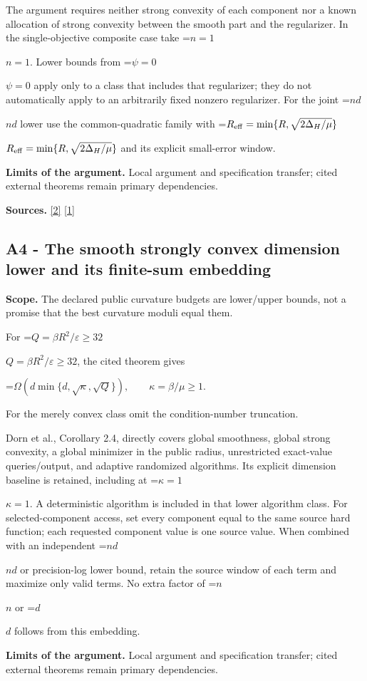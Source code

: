 \documentclass[10pt,a4paper]{article}
\newcommand{\AtlasMath}[1]{\par\begingroup\centering\setbox0=\hbox{$\displaystyle #1$}\ifdim\wd0>1.4\linewidth\typeout{ATLAS WIDE FORMULA: \the\wd0}\fi\ifdim\wd0>\linewidth\resizebox{\linewidth}{!}{\box0}\else\box0\fi\par\endgroup}
\newcommand{\AtlasInlineMath}[1]{\begingroup\setbox0=\hbox{$#1$}\ifdim\wd0>.4\linewidth\endgroup\AtlasMath{#1}\else\endgroup$#1$\fi}
\begin{document}
The argument requires neither strong convexity of each component nor a known allocation of strong convexity between the smooth part and the regularizer. In the single-objective composite case take \AtlasInlineMath{n=1}. Lower bounds from \AtlasInlineMath{\psi=0} apply only to a class that includes that regularizer; they do not automatically apply to an arbitrarily fixed nonzero regularizer. For the joint \AtlasInlineMath{nd} lower use the common-quadratic family with \AtlasInlineMath{R_{\rm eff}=\min\{R,\sqrt{2\Delta_H/\mu}\}} and its explicit small-error window.

\textbf{Limits of the argument.} Local argument and specification transfer; cited external theorems remain primary dependencies.

\textbf{Sources.} \href{https://papers.neurips.cc/paper_files/paper/2011/file/8f7d807e1f53eff5f9efbe5cb81090fb-Paper.pdf}{[2]} \href{https://arxiv.org/html/2610.00345v1}{[1]}

\subsection{A4 - The smooth strongly convex dimension lower and its finite-sum embedding}
\textbf{Scope.} The declared public curvature budgets are lower/upper bounds, not a promise that the best curvature moduli equal them.

For \AtlasInlineMath{Q=\beta R^2/\varepsilon\ge32}, the cited theorem gives

\AtlasMath{\Omega\!\left(d\min\{d,\sqrt\kappa,\sqrt Q\}\right),\qquad\kappa=\beta/\mu\ge1.}

For the merely convex class omit the condition-number truncation.

Dorn et al., Corollary 2.4, directly covers global smoothness, global strong convexity, a global minimizer in the public radius, unrestricted exact-value queries/output, and adaptive randomized algorithms. Its explicit dimension baseline is retained, including at \AtlasInlineMath{\kappa=1}. A deterministic algorithm is included in that lower algorithm class. For selected-component access, set every component equal to the same source hard function; each requested component value is one source value. When combined with an independent \AtlasInlineMath{nd} or precision-log lower bound, retain the source window of each term and maximize only valid terms. No extra factor of \AtlasInlineMath{n} or \AtlasInlineMath{d} follows from this embedding.

\textbf{Limits of the argument.} Local argument and specification transfer; cited external theorems remain primary dependencies.
\end{document}
